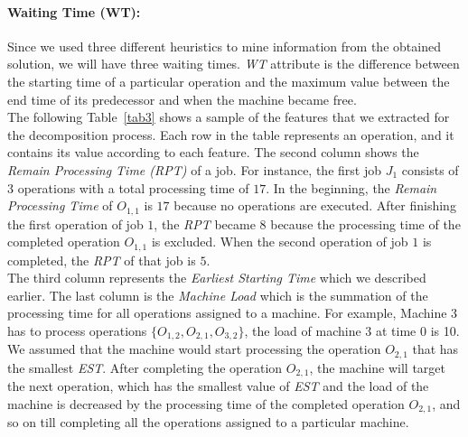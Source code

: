 \documentclass[runningheads]{llncs}
\begin{document}
\paragraph{{Waiting Time} (WT):}
Since we used three different heuristics to mine information from the obtained solution, we will have three waiting times. \textit{WT} attribute is the difference between the starting time of a particular operation and the maximum value between the end time of its predecessor and when the machine became free. \\


The following Table~\ref{tab3} shows a sample of the features that we extracted for the decomposition process. Each row in the table represents an operation, and it contains its value according to each feature. The second column shows the \textit{Remain Processing Time (RPT)} of a job. For instance, the first job $J_1$ consists of $3$ operations with a total processing time of $17$. In the beginning, the \textit{Remain Processing Time} of $O_{1,1}$ is $17$ because no operations are executed. After finishing the first operation of job $1$, the \textit{RPT} became $8$ because the processing time of the completed operation $O_{1,1}$ is excluded. When the second operation of job $1$ is completed, the \textit{RPT} of that job is $5$. \\

The third column represents the \textit{Earliest Starting Time} which we described earlier. The last column is the \textit{Machine Load} which is the summation of the processing time for all operations assigned to a machine. For example, Machine $3$ has to process operations $\{ O_{1,2}, O_{2,1}, O_{3,2} \}$, the load of machine $3$ at time $0$ is 10. We assumed that the machine would start processing the operation $O_{2,1}$ that has the smallest \textit{EST}. After completing the operation $O_{2,1}$, the machine will target the next operation, which has the smallest value of \textit{EST} and the load of the machine is decreased by the processing time of the completed operation $O_{2,1}$, and so on till completing all the operations assigned to a particular machine.
\end{document}
